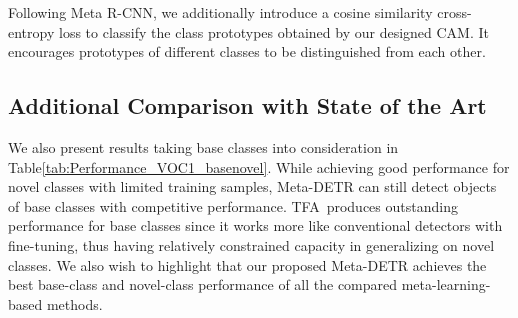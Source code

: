 \documentclass[letterpaper]{article} \usepackage{aaai22}  \usepackage{times}  \usepackage{helvet}  \usepackage{courier}  \usepackage[hyphens]{url}  \usepackage{graphicx} \urlstyle{rm} \def\UrlFont{\rm}  \usepackage{natbib}  \usepackage{caption} \DeclareCaptionStyle{ruled}{labelfont=normalfont,labelsep=colon,strut=off} \frenchspacing  \setlength{\pdfpagewidth}{8.5in}  \setlength{\pdfpageheight}{11in}  \usepackage{algorithm}
\begin{document}
Following Meta R-CNN\;\cite{metarcnn}, we additionally introduce a cosine similarity cross-entropy loss\;\cite{CloserFewshotClassification} to classify the class prototypes obtained by our designed CAM. It encourages prototypes of different classes to be distinguished from each other.



\subsection{Additional Comparison with State of the Art}

We also present results taking base classes into consideration in Table\;\ref{tab:Performance_VOC1_basenovel}. While achieving good performance for novel classes with limited training samples, Meta-DETR can still detect objects of base classes with competitive performance. TFA\,\cite{fsdet} produces outstanding performance for base classes since it works more like conventional detectors with fine-tuning, thus having relatively constrained capacity in generalizing on novel classes. We also wish to highlight that our proposed Meta-DETR achieves the best base-class and novel-class performance of all the compared meta-learning-based methods.
\end{document}
